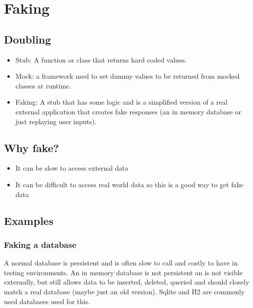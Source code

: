 \section{Faking}\label{sec:faking}

\subsection{Doubling}\label{sub:doubling}

\begin{itemize}
	\item Stub: A function or class that returns hard coded values.
	\item Mock: a framework used to set dummy values to be returned from mocked classes at runtime.
	\item Faking: A stub that has some logic and is a simplified version of a real external application that creates fake responses (an in memory database or just replaying user inputs).
\end{itemize}

\subsection{Why fake?}\label{sub:why_fake_}

\begin{itemize}
	\item It can be slow to access external data
	\item It can be difficult to access real world data so this is a good way to get fake data
\end{itemize}

\subsection{Examples}\label{sub:examples}

\subsubsection{Faking a database}\label{ssub:faking_a_database}

A normal database is persistent and is often slow to call and costly to have in testing environments.
An in memory database is not persistent an is not visible externally, but still allows data to be inserted, deleted, queried and should closely match a real database (maybe just an old version).
Sqlite and H2 are commonly used databases used for this.

